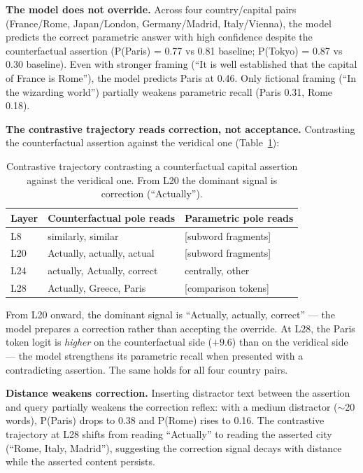 \documentclass[11pt]{article}
\begin{document}
\textbf{The model does not override.} Across four country/capital pairs (France/Rome,
Japan/London, Germany/Madrid, Italy/Vienna), the model predicts the correct
parametric answer with high confidence despite the counterfactual assertion
(P(Paris) = 0.77 vs 0.81 baseline; P(Tokyo) = 0.87 vs 0.30 baseline). Even
with stronger framing (``It is well established that the capital of France is
Rome''), the model predicts Paris at 0.46. Only fictional framing (``In the
wizarding world'') partially weakens parametric recall (Paris 0.31, Rome 0.18).

\textbf{The contrastive trajectory reads correction, not acceptance.} Contrasting
the counterfactual assertion against the veridical one (Table~\ref{tab:counterfactual}):

\begin{table}[htbp]
\centering
\small
\begin{tabular}{lll}
\toprule
Layer & Counterfactual pole reads & Parametric pole reads \\
\midrule
L8 & similarly, similar & [subword fragments] \\
L20 & Actually, actually, actual & [subword fragments] \\
L24 & actually, Actually, correct & centrally, other \\
L28 & Actually, Greece, Paris & [comparison tokens] \\
\bottomrule
\end{tabular}
\caption{Contrastive trajectory contrasting a counterfactual capital assertion against the veridical one. From L20 the dominant signal is correction (``Actually'').}
\label{tab:counterfactual}
\end{table}

From L20 onward, the dominant signal is ``Actually, actually, correct'' --- the
model prepares a correction rather than accepting the override. At L28, the
Paris token logit is \emph{higher} on the counterfactual side ($+9.6$) than on the
veridical side --- the model strengthens its parametric recall when presented
with a contradicting assertion. The same holds for all four
country pairs.

\textbf{Distance weakens correction.} Inserting distractor text between the
assertion and query partially weakens the correction reflex: with a medium
distractor ($\sim$20 words), P(Paris) drops to 0.38 and P(Rome) rises to 0.16.
The contrastive trajectory at L28 shifts from reading ``Actually'' to reading
the asserted city (``Rome, Italy, Madrid''), suggesting the correction signal
decays with distance while the asserted content persists.
\end{document}
